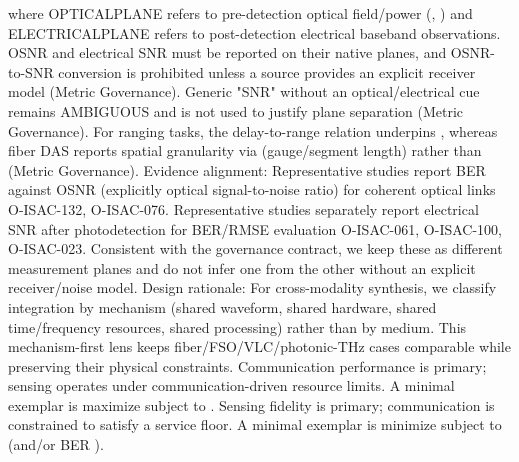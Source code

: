 {}\markdownRendererSoftLineBreak
{}where OPTICAL\markdownRendererUnderscore{}PLANE refers to pre-detection optical field/power (, ) and ELECTRICAL\markdownRendererUnderscore{}PLANE refers to post-detection electrical baseband observations. OSNR and electrical SNR must be reported on their native planes, and OSNR-to-SNR conversion is prohibited unless a source provides an explicit receiver model (Metric Governance). Generic "SNR" without an optical/electrical cue remains AMBIGUOUS and is not used to justify plane separation (Metric Governance). For ranging tasks, the delay-to-range relation  underpins , whereas fiber DAS reports spatial granularity via  (gauge/segment length) rather than  (Metric Governance).\markdownRendererParagraphSeparator
{}Evidence alignment: Representative studies report BER against OSNR (explicitly optical signal-to-noise ratio) for coherent optical links O-ISAC-132, O-ISAC-076.\markdownRendererSoftLineBreak
{}Representative studies separately report electrical SNR after photodetection for BER/RMSE evaluation O-ISAC-061, O-ISAC-100, O-ISAC-023. Consistent with the governance contract, we keep these as different measurement planes and do not infer one from the other without an explicit receiver/noise model.\markdownRendererInterblockSeparator
{}
\markdownRendererSectionEnd \markdownRendererSectionBegin
{}\markdownRendererInterblockSeparator
{}Design rationale: For cross-modality synthesis, we classify integration by mechanism (shared waveform, shared hardware, shared time/frequency resources, shared processing) rather than by medium. This mechanism-first lens keeps fiber/FSO/VLC/photonic-THz cases comparable while preserving their physical constraints.\markdownRendererParagraphSeparator
{} Communication performance is primary; sensing operates under communication-driven resource limits. A minimal exemplar is maximize  subject to .\markdownRendererParagraphSeparator
{} Sensing fidelity is primary; communication is constrained to satisfy a service floor. A minimal exemplar is minimize  subject to  (and/or BER \markdownRendererInlineMath{\le \beta}).\markdownRendererParagraphSeparator
